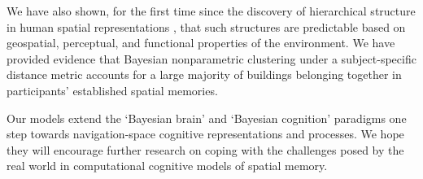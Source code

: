 We have also shown, for the first time since the discovery of hierarchical structure in human spatial representations \citep{hirtle1985evidence}, that such structures are predictable based on geospatial, perceptual, and functional properties of the environment. We have provided evidence that Bayesian nonparametric clustering under a subject-specific distance metric accounts for a large majority of buildings belonging together in participants' established spatial memories.

Our models extend the `Bayesian brain' \citep{knill2004bayesian} and `Bayesian cognition' \citep{chater2010bayesian} paradigms one step towards navigation-space cognitive representations and processes. We hope they will encourage further research on coping with the challenges posed by the real world in computational cognitive models of spatial memory.




 



